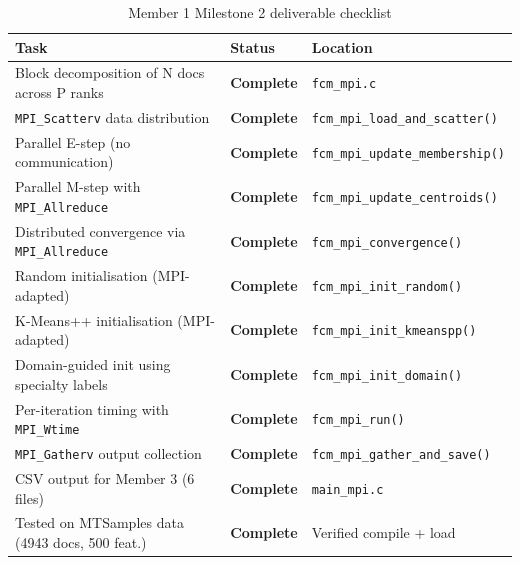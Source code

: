 \documentclass[12pt,a4paper]{article}
\begin{document}
\begin{table}[H]
\centering
\begin{tabularx}{\textwidth}{X l l}
\toprule
\textbf{Task} & \textbf{Status} & \textbf{Location} \\
\midrule
Block decomposition of N docs across P ranks      & \textcolor{green!60!black}{\bfseries Complete} & \texttt{fcm\_mpi.c} \\
\texttt{MPI\_Scatterv} data distribution          & \textcolor{green!60!black}{\bfseries Complete} & \texttt{fcm\_mpi\_load\_and\_scatter()} \\
Parallel E-step (no communication)               & \textcolor{green!60!black}{\bfseries Complete} & \texttt{fcm\_mpi\_update\_membership()} \\
Parallel M-step with \texttt{MPI\_Allreduce}      & \textcolor{green!60!black}{\bfseries Complete} & \texttt{fcm\_mpi\_update\_centroids()} \\
Distributed convergence via \texttt{MPI\_Allreduce} & \textcolor{green!60!black}{\bfseries Complete} & \texttt{fcm\_mpi\_convergence()} \\
Random initialisation (MPI-adapted)              & \textcolor{green!60!black}{\bfseries Complete} & \texttt{fcm\_mpi\_init\_random()} \\
K-Means++ initialisation (MPI-adapted)           & \textcolor{green!60!black}{\bfseries Complete} & \texttt{fcm\_mpi\_init\_kmeanspp()} \\
Domain-guided init using specialty labels        & \textcolor{green!60!black}{\bfseries Complete} & \texttt{fcm\_mpi\_init\_domain()} \\
Per-iteration timing with \texttt{MPI\_Wtime}    & \textcolor{green!60!black}{\bfseries Complete} & \texttt{fcm\_mpi\_run()} \\
\texttt{MPI\_Gatherv} output collection          & \textcolor{green!60!black}{\bfseries Complete} & \texttt{fcm\_mpi\_gather\_and\_save()} \\
CSV output for Member 3 (6 files)                & \textcolor{green!60!black}{\bfseries Complete} & \texttt{main\_mpi.c} \\
Tested on MTSamples data (4943 docs, 500 feat.)  & \textcolor{green!60!black}{\bfseries Complete} & Verified compile + load \\
\bottomrule
\end{tabularx}
\caption{Member 1 Milestone 2 deliverable checklist}
\end{table}

\end{document}

